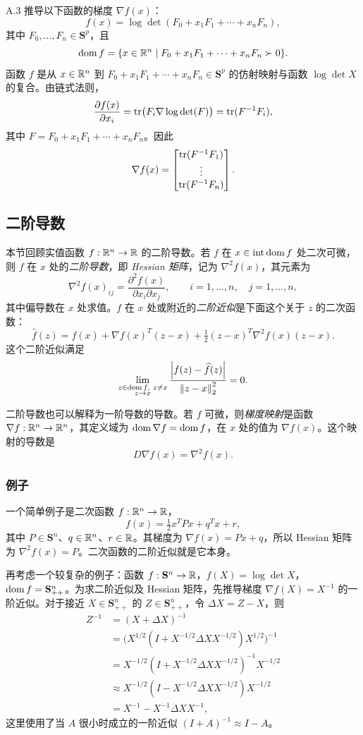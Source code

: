 \begin{origexample}{A.3}
推导以下函数的梯度 $\nabla f(x)$：
\[
 f(x)=\log\det(F_0+x_1F_1+\cdots+x_nF_n),
\]
其中 $F_0,\ldots,F_n\in\mathbf S^p$，且
\[
 \operatorname{dom} f=\{x\in\mathbb R^n\mid F_0+x_1F_1+\cdots+x_nF_n\succ0\}.
\]
函数 $f$ 是从 $x\in\mathbb R^n$ 到 $F_0+x_1F_1+\cdots+x_nF_n\in\mathbf S^p$ 的仿射映射与函数 $\log\det X$ 的复合。由链式法则，
\[
 \frac{\partial f(x)}{\partial x_i}
 =\operatorname{tr}\bigl(F_i\nabla\log\det(F)\bigr)=\operatorname{tr}(F^{-1}F_i),
\]
其中 $F=F_0+x_1F_1+\cdots+x_nF_n$。因此
\[
 \nabla f(x)=\begin{bmatrix}\operatorname{tr}(F^{-1}F_1)\\\vdots\\\operatorname{tr}(F^{-1}F_n)\end{bmatrix}.
\]
\end{origexample}

\subsection{二阶导数}
本节回顾实值函数 $f:\mathbb R^n\to\mathbb R$ 的二阶导数。若 $f$ 在 $x\in\operatorname{int}\operatorname{dom} f$ 处二次可微，则 $f$ 在 $x$ 处的\emph{二阶导数}，即 \emph{Hessian 矩阵}，记为 $\nabla^2f(x)$，其元素为
\[
 \nabla^2f(x)_{ij}=\frac{\partial^2f(x)}{\partial x_i\partial x_j},\qquad
 i=1,\ldots,n,\quad j=1,\ldots,n,
\]
其中偏导数在 $x$ 处求值。$f$ 在 $x$ 处或附近的\emph{二阶近似}是下面这个关于 $z$ 的二次函数：
\[
 \widehat f(z)=f(x)+\nabla f(x)^T(z-x)
 +\tfrac12(z-x)^T\nabla^2f(x)(z-x).
\]
这个二阶近似满足
\[
 \lim_{\substack{z\in\operatorname{dom} f,\ z\neq x\\z\to x}}
 \frac{\left\lvert f(z)-\widehat f(z)\right\rvert}{\left\lVert z-x\right\rVert_2^2}=0.
\]

二阶导数也可以解释为一阶导数的导数。若 $f$ 可微，则\emph{梯度映射}是函数 $\nabla f:\mathbb R^n\to\mathbb R^n$，其定义域为 $\operatorname{dom}\nabla f=\operatorname{dom} f$，在 $x$ 处的值为 $\nabla f(x)$。这个映射的导数是
\[
 D\nabla f(x)=\nabla^2f(x).
\]

\subsubsection*{例子}
一个简单例子是二次函数 $f:\mathbb R^n\to\mathbb R$，
\[
 f(x)=\tfrac12x^TPx+q^Tx+r,
\]
其中 $P\in\mathbf S^n$、$q\in\mathbb R^n$、$r\in\mathbb R$。其梯度为 $\nabla f(x)=Px+q$，所以 Hessian 矩阵为 $\nabla^2f(x)=P$。二次函数的二阶近似就是它本身。

再考虑一个较复杂的例子：函数 $f:\mathbf S^n\to\mathbb R$，$f(X)=\log\det X$，$\operatorname{dom} f=\mathbf S_{++}^n$。为求二阶近似及 Hessian 矩阵，先推导梯度 $\nabla f(X)=X^{-1}$ 的一阶近似。对于接近 $X\in\mathbf S_{++}^n$ 的 $Z\in\mathbf S_{++}^n$，令 $\Delta X=Z-X$，则
\begin{align*}
 Z^{-1}&=(X+\Delta X)^{-1}\\
 &=\bigl(X^{1/2}(I+X^{-1/2}\Delta XX^{-1/2})X^{1/2}\bigr)^{-1}\\
 &=X^{-1/2}(I+X^{-1/2}\Delta XX^{-1/2})^{-1}X^{-1/2}\\
 &\approx X^{-1/2}(I-X^{-1/2}\Delta XX^{-1/2})X^{-1/2}\\
 &=X^{-1}-X^{-1}\Delta XX^{-1},
\end{align*}
这里使用了当 $A$ 很小时成立的一阶近似 $(I+A)^{-1}\approx I-A$。

